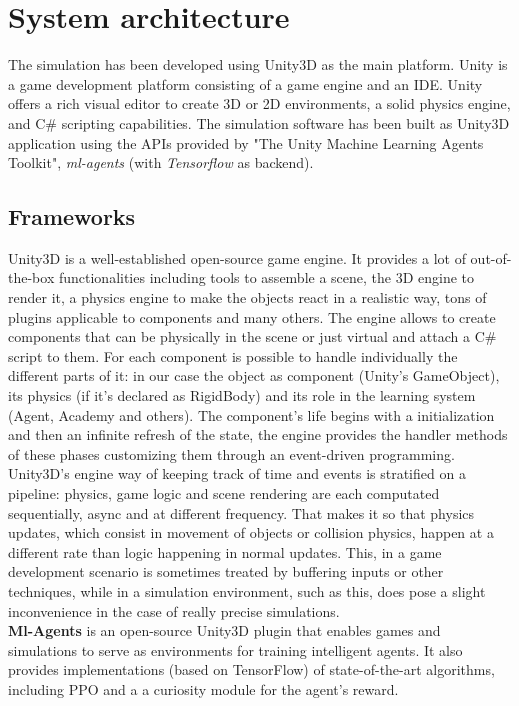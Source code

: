 \documentclass{ifacconf}
\begin{document}
\section{System architecture}
The simulation has been developed using Unity3D as the main platform.
Unity is a game development platform consisting of a game engine and an IDE. Unity offers a rich visual editor to create 3D or 2D environments, a solid physics engine, and C\# scripting capabilities.
The simulation software has been built as Unity3D application using the APIs provided by "The Unity Machine Learning Agents Toolkit", \emph{ml-agents} (with \emph{Tensorflow} as backend).

\subsection{Frameworks} 
Unity3D is a well-established open-source game engine. It provides a lot of out-of-the-box functionalities including tools to assemble a scene, the 3D engine to render it, a physics engine to make the objects react in a realistic way, tons of plugins applicable to components and many others. The engine allows to create components that can be physically in the scene or just virtual and attach a C\# script to them. For each component is possible to handle individually the different parts of it: in our case the object as component (Unity's GameObject), its physics (if it's declared as RigidBody) and its role in the learning system (Agent, Academy and others). The component's life begins with a initialization and then an infinite refresh of the state, the engine provides the handler methods of these phases customizing them through an event-driven programming. \\
Unity3D's engine way of keeping track of time and events is stratified on a pipeline: physics, game logic and scene rendering are each computated sequentially, async and at different frequency. That makes it so that physics updates, which consist in movement of objects or collision physics, happen at a different rate than logic happening in normal updates. This, in a game development scenario is sometimes treated by buffering inputs or other techniques, while in a simulation environment, such as this, does pose a slight inconvenience in the case of really precise simulations.\\
\textbf{Ml-Agents} is an open-source Unity3D plugin that enables games and simulations to serve as environments for training intelligent agents. It also provides implementations (based on TensorFlow) of state-of-the-art algorithms, including PPO and a a curiosity module for the agent's reward.
\end{document}
